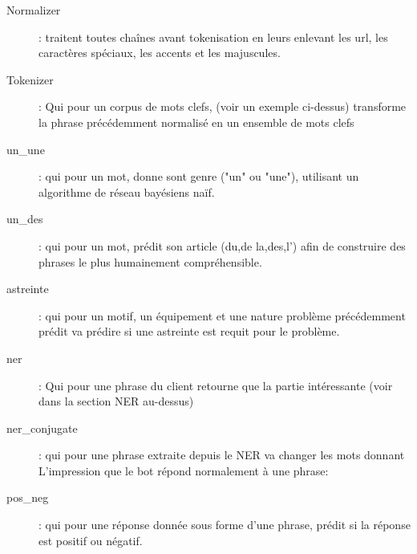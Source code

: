 \begin{description}
\item[Normalizer]: traitent toutes chaînes avant tokenisation en leurs enlevant les url, les caractères spéciaux, les accents et les majuscules.
\item[Tokenizer]: Qui pour un corpus de mots clefs, (voir un exemple ci-dessus) transforme la phrase précédemment normalisé en un ensemble de mots clefs
\item[un\_une]: qui pour un mot, donne sont genre ("un" ou "une"), utilisant un algorithme de réseau bayésiens naïf.
\item[un\_des]: qui pour un mot, prédit son article (du,de la,des,l') afin de construire des phrases le plus humainement compréhensible.
\item[astreinte]: qui pour un motif, un équipement et une nature problème précédemment prédit va prédire si une astreinte est requit pour le problème.
\item[ner]: Qui pour une phrase du client retourne que la partie intéressante (voir dans la section NER au-dessus)
\item[ner\_conjugate]: qui pour une phrase extraite depuis le NER va changer les mots donnant L’impression que le bot répond normalement à une phrase:
\item[pos\_neg]: qui pour une réponse donnée sous forme d'une phrase, prédit si la réponse est positif ou négatif.
\end{description}

